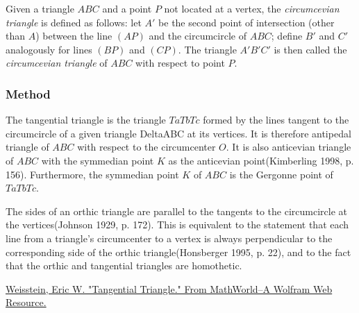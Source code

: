 Given a triangle $ABC$ and a point $P$ not located at a vertex, the \emph{circumcevian triangle} is defined as follows: let $A'$ be the second point of intersection (other than $A$) between the line $(AP)$ and the circumcircle of $ABC$; define $B'$ and $C'$ analogously for lines $(BP)$ and $(CP)$. The triangle $A'B'C'$ is then called the \emph{circumcevian triangle} of $ABC$ with respect to point $P$.

\vspace{1em}

\begin{tkzexample}[latex=6cm]
\begin{center}
\end{center}

\end{tkzexample}

\subsubsection{Method } %
\label{ssub:method_triangle_tangential}

The tangential triangle is the triangle $TaTbTc$ formed by the lines tangent to the circumcircle of a given triangle DeltaABC at its vertices. It is therefore antipedal triangle of $ABC$ with respect to the circumcenter $O$. It is also anticevian triangle of $ABC$ with the symmedian point $K$ as the anticevian point(Kimberling 1998, p. 156). Furthermore, the symmedian point $K$ of $ABC$ is the Gergonne point of $TaTbTc$.

The sides of an orthic triangle are parallel to the tangents to the circumcircle at the vertices(Johnson 1929, p. 172). This is equivalent to the statement that each line from a triangle's circumcenter to a vertex is always perpendicular to the corresponding side of the orthic triangle(Honsberger 1995, p. 22), and to the fact that the orthic and tangential triangles are homothetic.\begin{flushright}
  \small
\href{https://mathworld.wolfram.com/TangentialTriangle.html}{Weisstein, Eric W. "Tangential Triangle." From MathWorld--A Wolfram Web Resource.}
\end{flushright}

